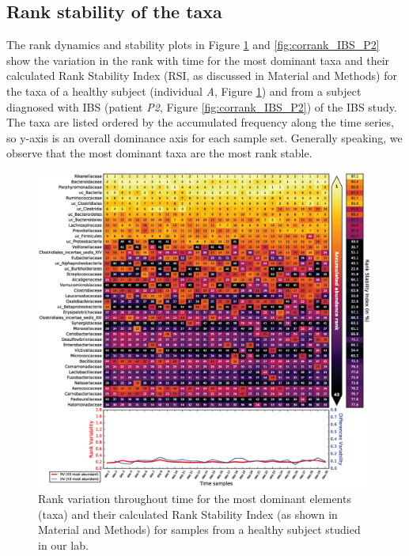 \subsection*{Rank stability of the taxa} 

The rank dynamics and stability plots in Figure \ref{fig:corrank_IBS_A} and \ref{fig:corrank_IBS_P2} show the variation in the rank with time for the most dominant taxa and their calculated Rank Stability Index (RSI, as discussed in Material and Methods) for the taxa of a healthy subject (individual \emph{A}, Figure \ref{fig:corrank_IBS_A}) and from a subject diagnosed with IBS (patient \emph{P2}, Figure \ref{fig:corrank_IBS_P2}) of the IBS study\cite{IBS}. The taxa are listed ordered by the accumulated frequency along the time series, so y-axis is an overall dominance axis for each sample set. Generally speaking, we observe that the most dominant taxa are the most rank stable. 

\begin{figure}
	\centering
	\includegraphics[width=0.99\textwidth]{figs/Fig4.eps}
	\caption{Rank variation throughout time for the most dominant elements (taxa) and their calculated Rank Stability Index (as shown in Material and Methods) for samples from a healthy subject studied in our lab\cite{IBS}.}
	\label{fig:corrank_IBS_A}
\end{figure}

